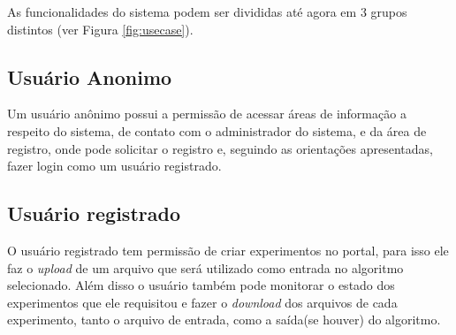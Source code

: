 \documentclass[tg]{mdtufsm}
\begin{document}
As funcionalidades do sistema podem ser divididas até agora em 3 grupos distintos (ver Figura \ref{fig:usecase}).
\subsection{Usuário Anonimo}
Um usuário anônimo possui a permissão de acessar áreas de informação a respeito do sistema, de contato com o administrador do sistema, e da área de registro, onde pode solicitar o registro e, seguindo as orientações apresentadas, fazer login como um usuário registrado.
\subsection{Usuário registrado}
O usuário registrado tem permissão de criar experimentos no portal, para isso ele faz o \emph{upload} de um arquivo que será utilizado como entrada no algoritmo selecionado. Além disso o usuário também pode monitorar o estado dos experimentos que ele requisitou e fazer o \emph{download} dos arquivos de cada experimento, tanto o arquivo de entrada, como a saída(se houver) do algoritmo.
\end{document}
